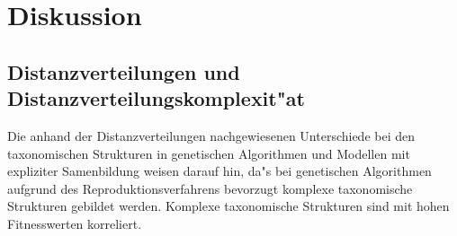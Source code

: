 \chapter{Diskussion}

\section{Distanzverteilungen und Distanzverteilungskomplexit"at}

Die anhand der Distanzverteilungen nachgewiesenen Unterschiede
bei den taxonomischen Strukturen in genetischen Algorithmen
und Modellen mit expliziter Samenbildung weisen darauf hin, da"s
bei genetischen Algorithmen aufgrund des Reproduktionsverfahrens
bevorzugt komplexe taxonomische Strukturen gebildet werden.
Komplexe taxonomische Strukturen sind mit hohen Fitnesswerten
korreliert.

